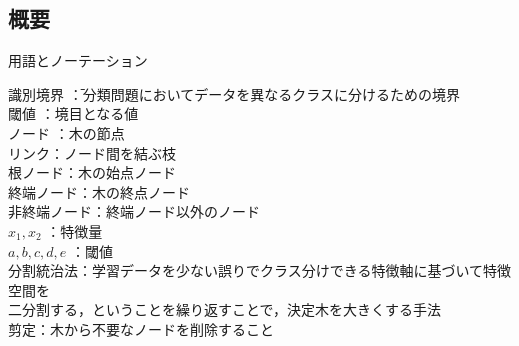 \documentclass[dvipdfmx]{jreport}
\begin{document}
\subsection{概要}
\begin{itembox}[l]{\large{用語とノーテーション}}
    \begin{tabbing}
        \hspace{15pt} \raisebox{0.5ex}{\tiny $\bullet$} 識別境界 \hspace{20pt}\=：分類問題においてデータを異なるクラスに分けるための境界\\[0.5em]
        \hspace{15pt} \raisebox{0.5ex}{\tiny $\bullet$} 閾値 \>：境目となる値\\[0.5em]
        \hspace{15pt} \raisebox{0.5ex}{\tiny $\bullet$} ノード \>：木の節点\\[0.5em]
        \hspace{15pt} \raisebox{0.5ex}{\tiny $\bullet$} リンク\>：ノード間を結ぶ枝\\[0.5em]
        \hspace{15pt} \raisebox{0.5ex}{\tiny $\bullet$} 根ノード\>：木の始点ノード\\[0.5em]
        \hspace{15pt} \raisebox{0.5ex}{\tiny $\bullet$} 終端ノード\>：木の終点ノード\\[0.5em]
        \hspace{15pt} \raisebox{0.5ex}{\tiny $\bullet$} 非終端ノード\>：終端ノード以外のノード\\[0.5em]

        \hspace{15pt} \raisebox{0.5ex}{\tiny $\bullet$} $x_1,x_2$ \>：特徴量\\[0.5em]
        \hspace{15pt} \raisebox{0.5ex}{\tiny $\bullet$} $a, b, c, d, e$ \>：閾値\\[0.5em]
        
        \hspace{15pt} \raisebox{0.5ex}{\tiny $\bullet$} 分割統治法\>：学習データを少ない誤りでクラス分けできる特徴軸に基づいて特徴空間を\\[0.5em]
        \>\hspace{6.5pt}二分割する，ということを繰り返すことで，決定木を大きくする手法\\[0.5em]
        \hspace{15pt} \raisebox{0.5ex}{\tiny $\bullet$} 剪定\>：木から不要なノードを削除すること

    \end{tabbing}
\end{itembox}
\end{document}
